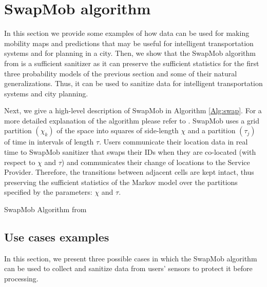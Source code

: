\documentclass[times,twocolumn,final,authoryear]{elsarticle}
\begin{document}
\section{SwapMob algorithm}\label{Sec:swapmob}
{\color{blue} 
In this section we provide some examples of how data can be used for making mobility maps and predictions that may be useful for intelligent transportation systems and for planning in a city.
Then, we show that the SwapMob algorithm from \cite{Salas:2018-c} is a sufficient sanitizer as it can preserve the sufficient statistics for the first three probability models of the previous section and some of their natural generalizations. Thus, it can be used to sanitize data for intelligent transportation systems and city planning.

Next, we give a high-level description of SwapMob in Algorithm \ref{Alg:swap}. For a more detailed explanation of the algorithm please refer to \cite{Salas:2018-c}. 
SwapMob uses a grid partition $(\chi_k)$ of the space into squares of side-length $\chi$ and a partition $(\tau_j)$ of time in intervals of length $\tau$.
Users communicate their location data in real time to SwapMob sanitizer that swaps their IDs when they are co-located (with respect to $\chi$ and $\tau$) and communicates their change of locations to the Service Provider.
Therefore, the transitions between adjacent cells are kept intact, thus preserving the sufficient statistics of the Markov model over the partitions specified by the parameters: $\chi$ and $\tau$.}
\begin{algorithm}[t]
\SetAlgoNoLine
{}

\caption{SwapMob Algorithm from \cite{Salas:2018-c}}\label{Alg:swap}
\label{alg:one}
\end{algorithm}


\subsection{Use cases examples}
{\color{blue}
In this section, we present three possible cases in which the SwapMob algorithm can be used to collect and sanitize data
from users' sensors to protect it before processing.
}
\end{document}
